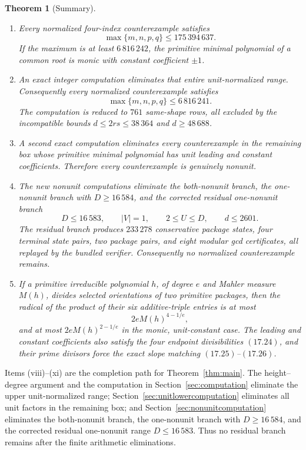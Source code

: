 \documentclass[11pt]{article}
\newtheorem{theorem}{Theorem}[section]
\theoremstyle{definition}
\begin{document}
\begin{theorem}[Summary]
\begin{enumerate}[label=(\roman*)]
\item Every normalized four-index counterexample satisfies
\[
 \max\{m,n,p,q\}\leq175\,394\,637.
\]
If the maximum is at least \(6\,816\,242\), the primitive minimal polynomial
of a common root is monic with constant coefficient \(\pm1\).

\item An exact integer computation eliminates that entire unit-normalized
range.  Consequently every normalized counterexample satisfies
\[
 \boxed{\max\{m,n,p,q\}\leq6\,816\,241.}
\]
The computation is reduced to \(761\) same-shape rows, all excluded by the
incompatible bounds \(d\leq2rs\leq38\,364\) and \(d\geq48\,688\).

\item A second exact computation eliminates every counterexample in the
remaining box whose primitive minimal polynomial has unit leading and
constant coefficients.  Therefore every counterexample is genuinely
nonunit.

\item The new nonunit computations eliminate the both-nonunit branch, the
one-nonunit branch with \(D\geq16\,584\), and the corrected residual
one-nonunit branch
\[
 D\leq16\,583,\qquad |V|=1,\qquad 2\leq U\leq D,\qquad d\leq2601.
\]
The residual branch produces \(233\,278\) conservative package states, four
terminal state pairs, two package pairs, and eight modular gcd certificates,
all replayed by the bundled verifier.  Consequently no normalized
counterexample remains.

\item If a primitive irreducible polynomial \(h\), of degree \(e\) and
Mahler measure \(M(h)\), divides selected orientations of two primitive
packages, then the radical of the product of their six additive-triple
entries is at most
\[
 2eM(h)^{4-1/e},
\]
and at most \(2eM(h)^{2-1/e}\) in the monic, unit-constant case.  The
leading and constant coefficients also satisfy the four endpoint
divisibilities \((17.24)\), and their prime divisors force the exact slope
matching \((17.25)\)--\((17.26)\).
\end{enumerate}
\end{theorem}

Items (viii)--(xi) are the completion path for Theorem~\ref{thm:main}.  The
height--degree argument and the computation in Section~\ref{sec:computation}
eliminate the upper unit-normalized range; Section~\ref{sec:unitlowercomputation}
eliminates all unit factors in the remaining box; and
Section~\ref{sec:nonunitcomputation} eliminates the both-nonunit branch, the
one-nonunit branch with \(D\geq16\,584\), and the corrected residual
one-nonunit range \(D\leq16\,583\).  Thus no residual branch remains after the
finite arithmetic eliminations.
\end{document}
